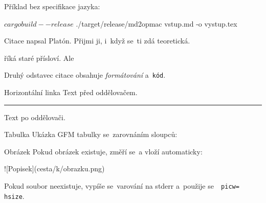 Příklad bez specifikace jazyka:

\begtt
$ cargo build --release
$ ./target/release/md2opmac vstup.md -o vystup.tex
\endtt


\sec Citace
\begcitation
{} napsal Platón.
Přijmi ji, i~když se~ti zdá teoretická.

\endcitation

\begcitation
{} říká staré přísloví.
Ale 

\endcitation

\begcitation
Druhý odstavec citace obsahuje {\it formátování} a~{\tt kód}.

\endcitation


\sec Horizontální linka
Text před oddělovačem.

\noindent\hrule

Text po oddělovači.


\sec Tabulka
Ukázka GFM tabulky se~zarovnáním sloupců:



\sec Obrázek
Pokud obrázek existuje, změří se~a vloží automaticky:

\begtt
![Popisek](cesta/k/obrazku.png)
\endtt

Pokud soubor neexistuje, vypíše se~varování na stderr a~použije se~{\tt {} picw= hsize}.


\bye
